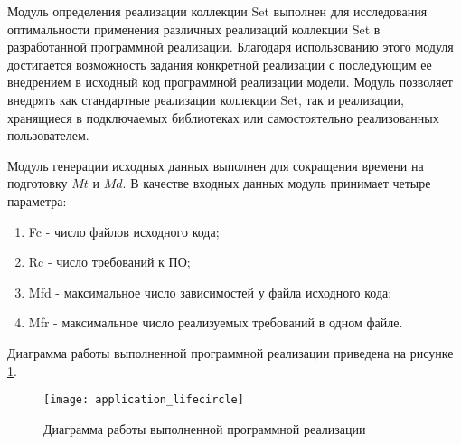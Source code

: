 Модуль определения реализации коллекции Set выполнен для исследования оптимальности применения различных реализаций коллекции Set в разработанной программной реализации. Благодаря использованию этого модуля достигается возможность задания конкретной реализации с последующим ее внедрением в исходный код программной реализации модели. Модуль позволяет внедрять как стандартные реализации коллекции Set, так и реализации, хранящиеся в подключаемых библиотеках или самостоятельно реализованных пользователем.

Модуль генерации исходных данных выполнен для сокращения времени на подготовку $Mt$ и $Md$.
В качестве входных данных модуль принимает четыре параметра:
\begin{enumerate}
    \item Fc - число файлов исходного кода;
    \item Rc - число требований к ПО;
    \item Mfd - максимальное число зависимостей у файла исходного кода;
    \item Mfr - максимальное число реализуемых требований в одном файле.
\end{enumerate}

Диаграмма работы выполненной программной реализации приведена на рисунке \ref{fig:application_lifecircle}.

\begin{figure}[H]
    \centering
    \texttt{[image: application\_lifecircle]}
    \caption{Диаграмма работы выполненной программной реализации}
    \label{fig:application_lifecircle}
\end{figure}